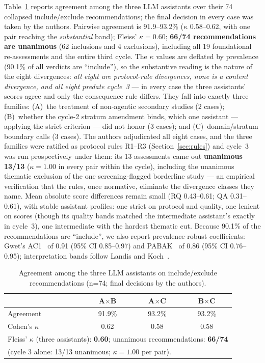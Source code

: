 \documentclass{ieeeaccess}
\begin{document}
Table~\ref{tab:kappa} reports agreement among the three LLM assistants
over their 74 collapsed include/exclude recommendations; the final
decision in every case was taken by the authors. Pairwise agreement is
91.9--93.2\% ($\kappa$ 0.58--0.62, with one pair reaching the
\emph{substantial} band); Fleiss' $\kappa=0.60$; \textbf{66/74
recommendations are unanimous} (62 inclusions and 4 exclusions), including all 19
foundational re-assessments and the entire third cycle. The $\kappa$
values are deflated by prevalence (90.1\% of all verdicts are
``include''), so the substantive reading is the nature of the eight
divergences: \emph{all eight are protocol-rule divergences, none is a
content divergence, and all eight predate cycle~3} --- in every case the
three assistants' scores agree and only the consequence rule differs.
They fall into exactly three families: (A)~the treatment of non-agentic
secondary studies (2 cases); (B)~whether the cycle-2 stratum amendment
binds, which one assistant --- applying the strict criterion --- did
not honor (3 cases); and (C)~domain/stratum boundary calls (3 cases).
The authors adjudicated all eight cases, and the three families were
ratified as protocol rules R1--R3
(Section~\ref{sec:rules}) and cycle~3 was run prospectively under them:
its 13 assessments came out \textbf{unanimous 13/13} ($\kappa=1.00$ in
every pair within the cycle), including the unanimous thematic exclusion
of the one screening-flagged borderline study --- an empirical
verification that the rules, once normative, eliminate the divergence
classes they name. Mean absolute score differences remain small
(RQ 0.43--0.61; QA 0.31--0.61), with stable assistant profiles:
one strict on protocol and quality, one lenient on scores (though its
quality bands matched the intermediate assistant's exactly in cycle~3),
one intermediate with the hardest thematic cut. Because 90.1\% of the
recommendations are ``include'', we also report prevalence-robust
coefficients: Gwet's AC1~\cite{gwet2008} of 0.91 (95\% CI 0.85--0.97)
and PABAK~\cite{byrt1993} of 0.86 (95\% CI 0.76--0.95); interpretation
bands follow Landis and Koch~\cite{landis1977}.

\begin{table}[!t]
\caption{Agreement among the three LLM assistants on include/exclude
recommendations (n=74; final decisions by the authors).}
\label{tab:kappa}
\centering
\begin{tabular}{@{}lccc@{}}
\toprule
 & \textbf{A$\times$B} & \textbf{A$\times$C} & \textbf{B$\times$C} \\
\midrule
Agreement        & 91.9\% & 93.2\% & 93.2\% \\
Cohen's $\kappa$ & 0.62   & 0.58   & 0.58   \\
\midrule
\multicolumn{4}{l}{Fleiss' $\kappa$ (three assistants): \textbf{0.60};
unanimous recommendations: \textbf{66/74}} \\
\multicolumn{4}{l}{(cycle 3 alone: 13/13 unanimous; $\kappa=1.00$ per
pair).} \\
\bottomrule
\end{tabular}
\end{table}
\end{document}
